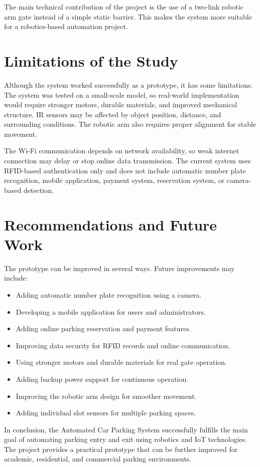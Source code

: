 The main technical contribution of the project is the use of a two-link robotic arm gate instead of a simple static barrier. This makes the system more suitable for a robotics-based automation project.

\section{Limitations of the Study}

Although the system worked successfully as a prototype, it has some limitations. The system was tested on a small-scale model, so real-world implementation would require stronger motors, durable materials, and improved mechanical structure. IR sensors may be affected by object position, distance, and surrounding conditions. The robotic arm also requires proper alignment for stable movement.

The Wi-Fi communication depends on network availability, so weak internet connection may delay or stop online data transmission. The current system uses RFID-based authentication only and does not include automatic number plate recognition, mobile application, payment system, reservation system, or camera-based detection.

\section{Recommendations and Future Work}

The prototype can be improved in several ways. Future improvements may include:

\begin{itemize}
    \item Adding automatic number plate recognition using a camera.
    \item Developing a mobile application for users and administrators.
    \item Adding online parking reservation and payment features.
    \item Improving data security for RFID records and online communication.
    \item Using stronger motors and durable materials for real gate operation.
    \item Adding backup power support for continuous operation.
    \item Improving the robotic arm design for smoother movement.
    \item Adding individual slot sensors for multiple parking spaces.
\end{itemize}

In conclusion, the Automated Car Parking System successfully fulfills the main goal of automating parking entry and exit using robotics and IoT technologies. The project provides a practical prototype that can be further improved for academic, residential, and commercial parking environments.

